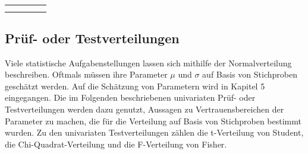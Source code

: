 \begin{table}[H]
{\begin{tabular}{| c | c | c | c | c |}
\parbox[c][0.5in][c]{1.3in}{\centering{}\selectfont{Rayleigh-
Verteilung}} & 
\parbox[c][0.5in][c]{1.1in}{\centering{}\selectfont{raylpdf(x,b)}} &
\parbox[c][0.5in][c]{1.1in}{\centering{}\selectfont{raylcdf(x,b)}} & 
\parbox[c][0.5in][c]{1.1in}{\centering{}\selectfont{raylinv(P,b)}}  & 
\parbox[c][0.5in][c]{1.4in}{\centering{}\selectfont{raylrnd(b)}} \\
\hline

\parbox[c][0.5in][c]{1.3in}{\centering{}\selectfont{Normalverteilung}} & 
\parbox[c][0.5in][c]{1.1in}{\centering{}\selectfont{normpdf(x,$\mu$,$\sigma$)}} &
\parbox[c][0.5in][c]{1.1in}{\centering{}\selectfont{normcdf(x,$\mu$,$\sigma$)}} & 
\parbox[c][0.5in][c]{1.1in}{\centering{}\selectfont{norminv(P,$\mu$,$\sigma$)}}  & 
\parbox[c][0.5in][c]{1.4in}{\centering{}\selectfont{normrnd($\mu$,$\sigma$)}} \\
\hline

\parbox[c][0.5in][c]{1.3in}{\centering{}\selectfont{Logarithmische 
Normalverteilung}} & 
\parbox[c][0.5in][c]{1.1in}{\centering{}\selectfont{lognpdf(x,$\mu$,$\sigma$)}} &
\parbox[c][0.5in][c]{1.1in}{\centering{}\selectfont{logncdf(x,$\mu$,$\sigma$)}} & 
\parbox[c][0.5in][c]{1.1in}{\centering{}\selectfont{loginv(P,$\mu$,$\sigma$)}}  & 
\parbox[c][0.5in][c]{1.4in}{\centering{}\selectfont{lognrnd($\mu$,$\sigma$)}} \\
\hline

\end{tabular}%
}
\label{tab:fourseventeen}
\end{table}

\clearpage

\subsection{Pr\"{u}f- oder Testverteilungen}

\noindent Viele statistische Aufgabenstellungen lassen sich mithilfe der Normalverteilung beschreiben. Oftmals m\"{u}ssen ihre Parameter $\mu$ und $\sigma$ auf Basis von Stichproben gesch\"{a}tzt werden. Auf die Sch\"{a}tzung von Parametern wird in Kapitel 5 eingegangen. Die im Folgenden beschriebenen univariaten Pr\"{u}f- oder Testverteilungen werden dazu genutzt, Aussagen zu Vertrauensbereichen der Parameter zu machen, die f\"{u}r die Verteilung auf Basis von Stichproben bestimmt wurden. Zu den univariaten Testverteilungen z\"{a}hlen die t-Verteilung von Student, die Chi-Quadrat-Verteilung und die F-Verteilung von Fisher.\newline

